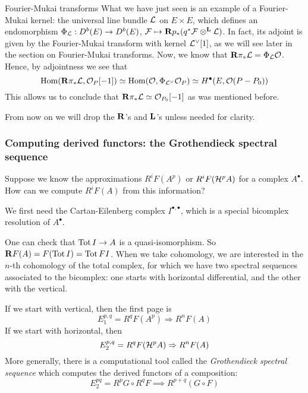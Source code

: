 \begin{remark}{Fourier-Mukai transforms}{}
    What we have just seen is an example of a Fourier-Mukai kernel: the universal line bundle $\mathcal{L}$ on $E\times E$, which defines an endomorphism $\Phi_{\mathcal{L}}:D^b(E)\to D^b(E)$, $\mathcal{F}\mapsto\mathbf{R} p_*(q^*\mathcal{F}\otimes^{\mathbf{L}}\mathcal{L})$. In fact, its adjoint is given by the Fourier-Mukai transform with kernel $\mathcal{L}^\vee [1]$, as we will see later in the section on Fourier-Mukai transforms. Now, we know that $\mathbf{R} \pi_* \mathcal{L} = \Phi_{\mathcal{L}} \mathcal{O}$. Hence, by adjointness we see that $$\operatorname{Hom}(\mathbf{R} \pi_* \mathcal{L}, \mathcal{O}_{P}[-1])\simeq \operatorname{Hom}(\mathcal{O}, \Phi_{\mathcal{L}^\vee}\mathcal{O}_{P})\simeq H^\bullet(E, \mathcal{O}(P-P_0))$$This allows us to conclude that $\mathbf{R} \pi_* \mathcal{L} \simeq \mathcal{O}_{P_0}[-1]$ as was mentioned before.
\end{remark}

From now on we will drop the $\mathbf{R}$'s and $\mathbf{L}$'s unless needed for clarity.

\subsubsection{Computing derived functors: the Grothendieck spectral sequence}

Suppose we know the approximations $R^iF(A^p)$ or $R^iF(\mathcal{H}^pA)$ for a complex $A^\bullet$. How can we compute $R^iF(A)$ from this information?

We first need the Cartan-Eilenberg complex $I^{\bullet, \bullet}$, which is a special bicomplex resolution of $A^\bullet$.

One can check that $\operatorname{Tot} I \to A$ is a quasi-isomorphism. So $\mathbf{R} F(A)=F(\operatorname{Tot} I)=\operatorname{Tot} FI$. When we take cohomology, we are interested in the $n$-th cohomology of the total complex, for which we have two spectral sequences associated to the bicomplex: one starts with horizontal differential, and the other with the vertical.

If we start with vertical, then the first page is
\begin{equation*}
    E_1^{p,q} = R^qF(A^p) \Rightarrow R^nF(A)
\end{equation*}
If we start with horizontal, then
\begin{equation*}
    E_2^{p,q} = R^qF(\mathcal{H}^pA) \Rightarrow R^nF(A)
\end{equation*}
More generally, there is a computational tool called the \emph{Grothendieck spectral sequence} which computes the derived functors of a composition: $$E_2^{pq}=R^pG \circ R^q F\implies R^{p+q}(G\circ F)$$

